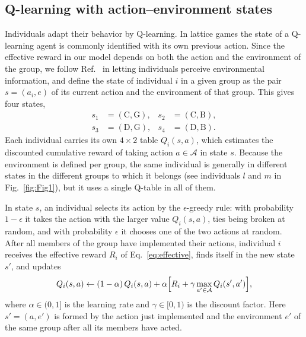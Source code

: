 \documentclass[%
  aip,cha,
  amsmath,amssymb,
  reprint,
  article-title,
]{revtex4-2}
\begin{document}
\subsection{Q-learning with action--environment states}\label{sec:qlearning}

Individuals adapt their behavior by Q-learning.\cite{watkins1992qlearning,sutton2018reinforcement} In lattice games the state of a Q-learning agent is commonly identified with its own previous action.\cite{wang2022levy,fan2022incorporating,du2026shaping} Since the effective reward in our model depends on both the action and the environment of the group, we follow Ref.~ in letting individuals perceive environmental information, and define the state of individual $i$ in a given group as the pair $s=(a_i,e)$ of its current action and the environment of that group. This gives four states,
\begin{equation}
\begin{aligned}
s_1&=(\mathrm{C},\mathrm{G}), & s_2&=(\mathrm{C},\mathrm{B}),\\
s_3&=(\mathrm{D},\mathrm{G}), & s_4&=(\mathrm{D},\mathrm{B}).
\end{aligned}
\label{eq:states}
\end{equation}
Each individual carries its own $4\times2$ table $Q_i(s,a)$, which estimates the discounted cumulative reward of taking action $a\in\mathcal{A}$ in state $s$. Because the environment is defined per group, the same individual is generally in different states in the different groups to which it belongs (see individuals $l$ and $m$ in Fig.~\ref{fig:Fig1}), but it uses a single Q-table in all of them.

In state $s$, an individual selects its action by the $\epsilon$-greedy rule: with probability $1-\epsilon$ it takes the action with the larger value $Q_i(s,a)$, ties being broken at random, and with probability $\epsilon$ it chooses one of the two actions at random. After all members of the group have implemented their actions, individual $i$ receives the effective reward $R_i$ of Eq.~\eqref{eq:effective}, finds itself in the new state $s'$, and updates
\begin{equation}
Q_i(s,a)\leftarrow(1-\alpha)\,Q_i(s,a)+\alpha\Bigl[R_i+\gamma\max_{a'\in\mathcal{A}}Q_i(s',a')\Bigr],
\label{eq:q-learning}
\end{equation}
where $\alpha\in(0,1]$ is the learning rate and $\gamma\in[0,1)$ is the discount factor. Here $s'=(a,e')$ is formed by the action just implemented and the environment $e'$ of the same group after all its members have acted.
\end{document}
